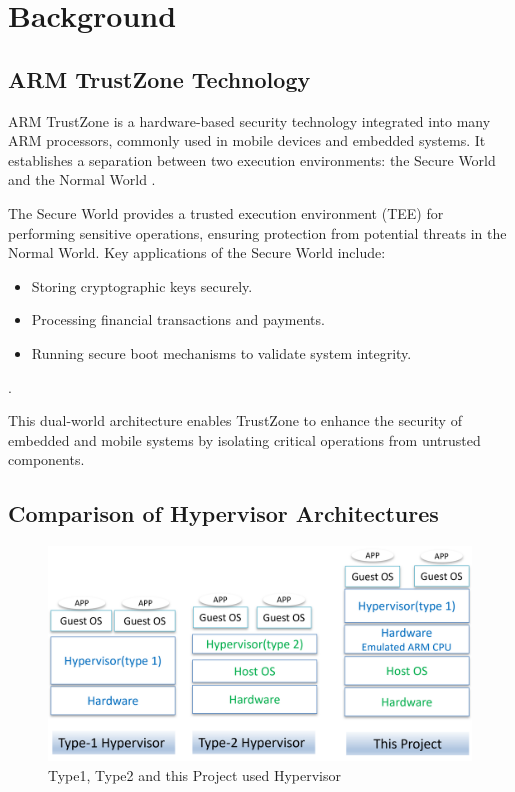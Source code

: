 \documentclass[acmtog]{acmart}
\begin{document}
\section{Background}

\subsection{ARM TrustZone Technology}
ARM TrustZone is a hardware-based security technology integrated into many ARM processors, commonly used in mobile devices and embedded systems. It establishes a separation between two execution environments: the Secure World and the Normal World \cite{10.1145/3426020.3426113, partemu,10.1007/978-3-030-22496-7_9}.

The Secure World provides a trusted execution environment (TEE) for performing sensitive operations, ensuring protection from potential threats in the Normal World. Key applications of the Secure World include:
\begin{itemize}
  \item Storing cryptographic keys securely.
  \item Processing financial transactions and payments.
  \item Running secure boot mechanisms to validate system integrity.
\end{itemize}\cite{ 10.1145/3313808.3313810, partemu,10.1007/978-3-030-22496-7_9}.

This dual-world architecture enables TrustZone to enhance the security of embedded and mobile systems by isolating critical operations from untrusted components.



\subsection{Comparison of Hypervisor Architectures}
 
\begin{figure}[ht]
  \centering
  \includegraphics[width=\columnwidth]{images/type12_hyper.png}
  \caption{Type1, Type2 and this Project used Hypervisor}
  \label{fig:compare_hypervisor}
\end{figure}
\end{document}

